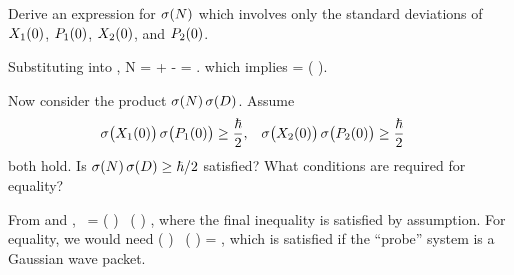 \begin{problem}
	Derive an expression for $\sigma(N)$ which involves only the standard deviations of $X_1(0)$, $P_1(0)$, $X_2(0)$, and $P_2(0)$.
\end{problem}

\begin{solution}
	Substituting  into ,
	\beq
		N = \Xwo +  \Xqo - \Xqo = \Xwo.
	\eeq
	which implies
	\beqn \label{sigN}
		\sigN = \sigma\big( \Xwo \big).
	\eeqn
\end{solution}

\begin{problem}
	Now consider the product $\sigma(N) \, \sigma(D)$.  Assume
	\begin{align*}
		\sigma\big( X_1(0) \big) \, \sigma\big( P_1(0) \big) &\geq \frac{\hbar}{2}, &
		\sigma\big( X_2(0) \big) \, \sigma\big( P_2(0) \big) &\geq \frac{\hbar}{2}
	\end{align*}
	both hold.  Is $\sigma(N) \, \sigma(D) \geq \hbar / 2$ satisfied?  What conditions are required for equality?
\end{problem}

\begin{solution}
	From  and ,
	\beq
		\sigN \, \sigD = \sigma\big( \Pwo \big) \, \sigma\big( \Xwo \big) \geq {},
	\eeq
	where the final inequality is satisfied by assumption.  For equality, we would need
	\beq
		\sigma\big( \Xwo \big) \, \sigma\big( \Pwo \big) = ,
	\eeq
	which is satisfied if the ``probe'' system is a Gaussian wave packet.
\end{solution}